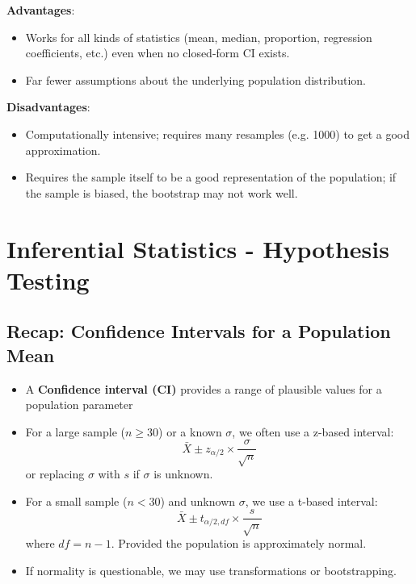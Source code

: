 \documentclass[10pt]{extarticle}
\begin{document}
\textbf{Advantages}:
\begin{itemize}
    \item Works for all kinds of statistics (mean, median, proportion, regression coefficients, etc.) even when no closed-form CI exists.
    \item Far fewer assumptions about the underlying population distribution.
\end{itemize}
\textbf{Disadvantages}:
\begin{itemize}
    \item Computationally intensive; requires many resamples (e.g. 1000) to get a good approximation.
    \item Requires the sample itself to be a good representation of the population; if the sample is biased, the bootstrap may not work well.
\end{itemize}
\section{Inferential Statistics - Hypothesis Testing}
\subsection*{Recap: Confidence Intervals for a Population Mean}
\vfill
\begin{itemize}
    \item A \textbf{Confidence interval (CI)} provides a range of plausible values for a population parameter
    \item For a large sample ($n \geq 30$) or a known $\sigma$, we often use a z-based interval:
    $$\bar{X} \pm z_{\alpha/2} \times \frac{\sigma}{\sqrt{n}}$$
    or replacing $\sigma$ with $s$ if $\sigma$ is unknown.
    \item For a small sample ($n < 30$) and unknown $\sigma$, we use a t-based interval:
    $$\bar{X} \pm t_{\alpha/2, df} \times \frac{s}{\sqrt{n}}$$
    where $df = n - 1$. Provided the population is approximately normal.
    \item If normality is questionable, we may use transformations or bootstrapping. 
\end{itemize}
\vfill
\end{document}
